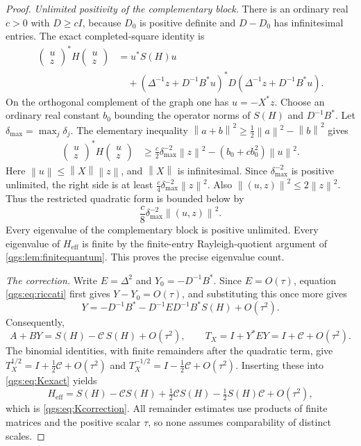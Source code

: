 \documentclass[11pt,oneside]{article}
\numberwithin{equation}{section}
\theoremstyle{plain}
\theoremstyle{definition}
\theoremstyle{remark}
\newcommand{\Heff}{H_{\mathrm{eff}}}
\newcommand{\Corr}{\mathcal C}
\newcommand{\norm}[1]{\left\|#1\right\|}
\begin{document}
\begin{proof}
\textit{Unlimited positivity of the complementary block.}
There is an ordinary real $c>0$ with $D\ge cI$, because $D_0$ is positive definite and $D-D_0$ has infinitesimal entries. The exact completed-square identity is
\begin{align}\label{qgs:eq:completesquare}
 \begin{pmatrix}u\\z\end{pmatrix}^{\!*}
 H\begin{pmatrix}u\\z\end{pmatrix}
 &=u^*S(H)u\\
 &\quad+(\Delta^{-1}z+D^{-1}B^*u)^*
 D(\Delta^{-1}z+D^{-1}B^*u).\nonumber
\end{align}
On the orthogonal complement of the graph one has $u=-X^*z$. Choose an ordinary real constant $b_0$ bounding the operator norms of $S(H)$ and $D^{-1}B^*$. Let $\delta_{\max}=\max_j\delta_j$. The elementary inequality $\norm{a+b}^2\ge\tfrac12\norm a^2-\norm b^2$ gives
\begin{align*}
 \begin{pmatrix}u\\z\end{pmatrix}^{\!*}
 H\begin{pmatrix}u\\z\end{pmatrix}
 &\ge \frac c2\delta_{\max}^{-2}\norm z^2
 -(b_0+cb_0^2)\norm u^2.
\end{align*}
Here $\norm u\le\norm X\norm z$, and $\norm X$ is infinitesimal. Since $\delta_{\max}^{-2}$ is positive unlimited, the right side is at least $\tfrac c4\delta_{\max}^{-2}\norm z^2$. Also $\norm{(u,z)}^2\le2\norm z^2$. Thus the restricted quadratic form is bounded below by
\[
 \frac c8\delta_{\max}^{-2}\norm{(u,z)}^2.
\]
Every eigenvalue of the complementary block is positive unlimited. Every eigenvalue of $\Heff$ is finite by the finite-entry Rayleigh-quotient argument of \cref{qgs:lem:finitequantum}. This proves the precise eigenvalue count.

\textit{The correction.}
Write $E=\Delta^2$ and $Y_0=-D^{-1}B^*$. Since $E=O(\tau)$, equation \eqref{qgs:eq:riccati} first gives $Y-Y_0=O(\tau)$, and substituting this once more gives
\begin{equation}\label{qgs:eq:Yexpansion}
 Y=-D^{-1}B^*-D^{-1}ED^{-1}B^*S(H)+O(\tau^2).
\end{equation}
Consequently,
\[
 A+BY=S(H)-\Corr\,S(H)+O(\tau^2),\qquad
 T_X=I+Y^*EY=I+\Corr+O(\tau^2).
\]
The binomial identities, with finite remainders after the quadratic term, give $T_X^{1/2}=I+\tfrac12\Corr+O(\tau^2)$ and $T_X^{-1/2}=I-\tfrac12\Corr+O(\tau^2)$. Inserting these into \eqref{qgs:eq:Kexact} yields
\[
 \Heff=S(H)-\Corr S(H)+\tfrac12\Corr S(H)-\tfrac12S(H)\Corr+O(\tau^2),
\]
which is \eqref{qgs:eq:Kcorrection}. All remainder estimates use products of finite matrices and the positive scalar $\tau$, so none assumes comparability of distinct scales.
\end{proof}
\end{document}
